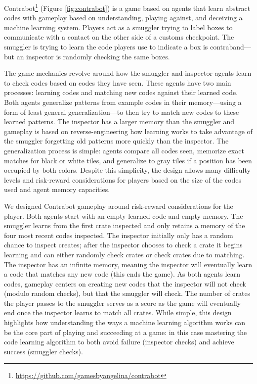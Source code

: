 \documentclass{sig-alternate}
\begin{document}
{\sc Contrabot}\footnote{\url{https://github.com/gamesbyangelina/contrabot}} (Figure \ref{fig:contrabot}) is a game based on agents that learn abstract codes with gameplay based on understanding, playing against, and deceiving a machine learning system.
%
Players act as a smuggler trying to label boxes to communicate with a contact on the other side of a customs checkpoint.
The smuggler is trying to learn the code players use to indicate a box is contraband---but an inspector is randomly checking the same boxes.

The game mechanics revolve around how the smuggler and inspector agents learn to check codes based on codes they have seen.
These agents have two main processes: learning codes and matching new codes against their learned code.
Both agents generalize patterns from example codes in their memory---using a form of least general generalization---to then try to match new codes to these learned patterns.
The inspector has a larger memory than the smuggler and gameplay is based on reverse-engineering how learning works to take advantage of the smuggler forgetting old patterns more quickly than the inspector.
%
The generalization process is simple: agents compare all codes seen, memorize exact matches for black or white tiles, and generalize to gray tiles if a position has been occupied by both colors.
Despite this simplicity, the design allows many difficulty levels and risk-reward considerations for players based on the size of the codes used and agent memory capacities.

We designed {\sc Contrabot} gameplay around risk-reward considerations for the player.
Both agents start with an empty learned code and empty memory. 
The smuggler learns from the first crate inspected and only retains a memory of the four most recent codes inspected. 
The inspector initially only has a random chance to inspect creates; after the inspector chooses to check a crate it begins learning and can either randomly check crates or check crates due to matching.
The inspector has an infinite memory, meaning the inspector will eventually learn a code that matches any new code (this ends the game).
As both agents learn codes, gameplay centers on creating new codes that the inspector will not check (modulo random checks), but that the smuggler will check.
The number of crates the player passes to the smuggler serves as a score as the game will eventually end once the inspector learns to match all crates.
While simple, this design highlights how understanding the ways a machine learning algorithm works can be the core part of playing and succeeding at a game: in this case mastering the code learning algorithm to both avoid failure (inspector checks) and achieve success (smuggler checks).
\end{document}
